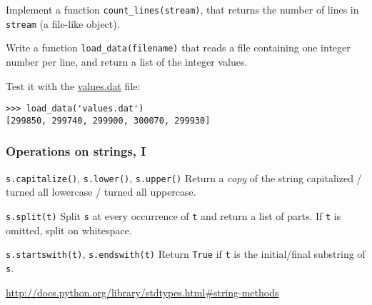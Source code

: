 \documentclass[english,serif,mathserif,xcolor=pdftex,dvipsnames,table]{beamer}
\begin{document}
\begin{frame}[fragile]
  \begin{exercise}
    Implement a function \lstinline|count_lines(stream)|, that returns
    the number of lines in \lstinline|stream| (a file-like object).
  \end{exercise}

  \+
  \begin{exercise}
    Write a function \lstinline|load_data(filename)| that reads a file
    containing one integer number per line, and return a list of the
    integer values.

    \+ 
    Test it with the
    \href{http://www.gc3.uzh.ch/values.dat}{values.dat}
    file: 
\begin{lstlisting}
>>> load_data('values.dat')
[299850, 299740, 299900, 300070, 299930]
\end{lstlisting}
  \end{exercise}
\end{frame}


\begin{frame}[fragile]
  \frametitle{Operations on strings, I}
  \begin{describe}{%
      \lstinline|s.capitalize()|,
      \lstinline|s.lower()|, 
      \lstinline|s.upper()|}
    Return a \emph{copy} of the string capitalized / turned all lowercase /
    turned all uppercase.
  \end{describe}
  
  \begin{describe}{\lstinline|s.split(t)|}
    Split \texttt{s} at every occurrence of \texttt{t} and return a list
    of parts.  If \texttt{t} is omitted, split on whitespace.
  \end{describe}
  
  \begin{describe}{\lstinline|s.startswith(t)|, 
      \lstinline|s.endswith(t)|}
    Return \texttt{True} if \texttt{t} is the initial/final substring
    of \texttt{s}.
  \end{describe}
  
  \begin{references}
    \url{http://docs.python.org/library/stdtypes.html#string-methods}
  \end{references}
\end{frame}
\end{document}

